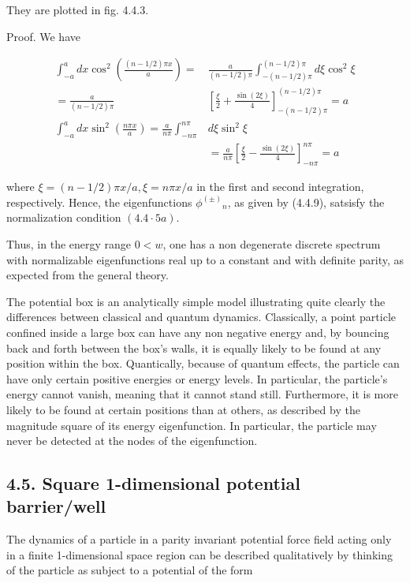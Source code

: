 \documentclass{article}
\begin{document}
They are plotted in fig. 4.4.3.

Proof. We have
 
\begin{align*}
\int_{-a}^{a} d x \cos ^{2}\left(\frac{(n-1 / 2) \pi x}{a}\right)= & \frac{a}{(n-1 / 2) \pi} \int_{-(n-1 / 2) \pi}^{(n-1 / 2) \pi} d \xi \cos ^{2} \xi  \tag{4.4.11a}\\
=\frac{a}{(n-1 / 2) \pi} & {\left[\frac{\xi}{2}+\frac{\sin (2 \xi)}{4}\right]_{-(n-1 / 2) \pi}^{(n-1 / 2) \pi}=a } \\
\int_{-a}^{a} d x \sin ^{2}\left(\frac{n \pi x}{a}\right)=\frac{a}{n \pi} \int_{-n \pi}^{n \pi} & d \xi \sin ^{2} \xi  \tag{4.4.11b}\\
& =\frac{a}{n \pi}\left[\frac{\xi}{2}-\frac{\sin (2 \xi)}{4}\right]_{-n \pi}^{n \pi}=a
\end{align*}
 
where $\xi=(n-1 / 2) \pi x / a, \xi=n \pi x / a$ in the first and second integration, respectively. Hence, the eigenfunctions $\phi^{( \pm)}{ }_{n}$, as given by (4.4.9), satsisfy the normalization condition $(4.4 \cdot 5 a)$.

Thus, in the energy range $0<w$, one has a non degenerate discrete spectrum with normalizable eigenfunctions real up to a constant and with definite parity, as expected from the general theory.

The potential box is an analytically simple model illustrating quite clearly the differences between classical and quantum dynamics. Classically, a point particle confined inside a large box can have any non negative energy and, by bouncing back and forth between the box's walls, it is equally likely to be found at any position within the box. Quantically, because of quantum effects, the particle can have only certain positive energies or energy levels. In particular, the particle's energy cannot vanish, meaning that it cannot stand still. Furthermore, it is more likely to be found at certain positions than at others, as described by the magnitude square of its energy eigenfunction. In particular, the particle may never be detected at the nodes of the eigenfunction.

\subsection*{4.5. Square 1-dimensional potential barrier/well}

The dynamics of a particle in a parity invariant potential force field acting only in a finite 1-dimensional space region can be described qualitatively by thinking of the particle as subject to a potential of the form
 
\end{document}

